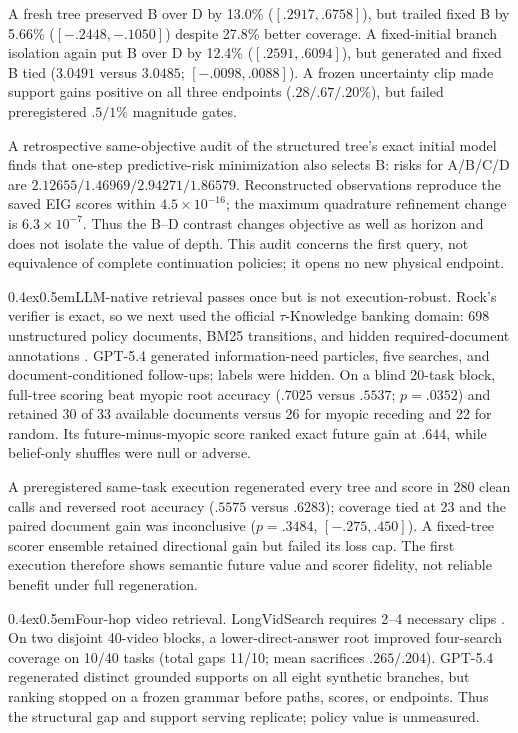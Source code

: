 \documentclass[10pt]{article}
\makeatletter
\renewcommand\paragraph{\@startsection{paragraph}{4}{0pt}%
  {0.4ex}{0.5em}{\normalfont\normalsize\bfseries}}
\makeatother
\begin{document}
A fresh tree preserved B over D by 13.0\% ($[.2917,.6758]$), but trailed fixed
B by 5.66\% ($[-.2448,-.1050]$) despite 27.8\% better coverage. A fixed-initial
branch isolation again put B over D by 12.4\% ($[.2591,.6094]$), but generated
and fixed B tied ($3.0491$ versus $3.0485$; $[-.0098,.0088]$). A frozen
uncertainty clip made support gains positive on all three endpoints
($.28/.67/.20\%$), but failed preregistered $.5/1\%$ magnitude gates.

A retrospective same-objective audit of the structured tree's exact initial
model finds that one-step predictive-risk minimization also selects B:
risks for A/B/C/D are $2.12655/1.46969/2.94271/1.86579$. Reconstructed
observations reproduce the saved EIG scores within $4.5\times10^{-16}$;
the maximum quadrature refinement change is $6.3\times10^{-7}$.
Thus the B--D contrast changes objective as well as horizon and does not isolate
the value of depth. This audit concerns the first query, not equivalence of
complete continuation policies; it opens no new physical endpoint.

\paragraph{LLM-native retrieval passes once but is not execution-robust.}
Rock's verifier is exact, so we next used the official $\tau$-Knowledge banking
domain: 698 unstructured policy documents, BM25 transitions, and hidden
required-document annotations \citep{shi2026tau}. GPT-5.4 generated
information-need particles, five searches, and document-conditioned follow-ups;
labels were hidden. On a blind 20-task block, full-tree scoring beat myopic
root accuracy ($.7025$ versus $.5537$; $p=.0352$) and retained 30 of 33
available documents versus 26 for myopic receding and 22 for random. Its
future-minus-myopic score ranked exact future gain at $.644$, while belief-only
shuffles were null or adverse.

A preregistered same-task execution regenerated every tree and score in 280
clean calls and reversed root accuracy ($.5575$ versus $.6283$); coverage tied
at 23 and the paired document gain was inconclusive
($p=.3484$, $[-.275,.450]$). A fixed-tree scorer ensemble retained directional
gain but failed its loss cap. The first execution therefore shows semantic
future value and scorer fidelity, not reliable benefit under full regeneration.

\paragraph{Four-hop video retrieval.}
LongVidSearch requires 2--4 necessary clips \citep{yu2026longvidsearch}.
On two disjoint 40-video blocks, a lower-direct-answer root improved four-search
coverage on 10/40 tasks (total gaps 11/10; mean sacrifices $.265/.204$).
GPT-5.4 regenerated distinct grounded supports on all eight synthetic branches,
but ranking stopped on a frozen grammar before paths, scores, or endpoints.
Thus the structural gap and support serving replicate; policy value is unmeasured.
\end{document}
